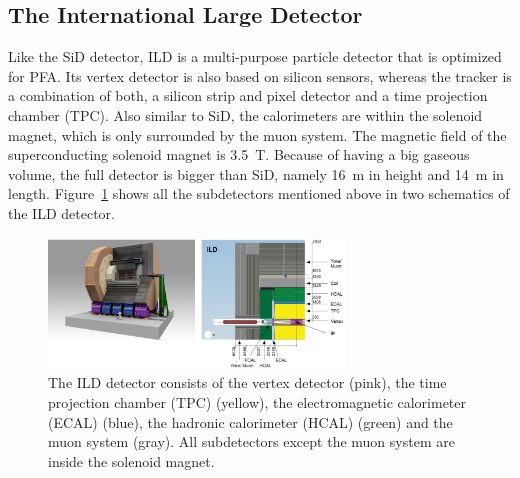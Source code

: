 \subsection{The International Large Detector}
Like the SiD detector, ILD is a multi-purpose particle detector that is optimized for PFA.
Its vertex detector is also based on silicon sensors, whereas the tracker is a combination of both, a silicon strip and pixel detector and a time projection chamber (TPC).
Also similar to SiD, the calorimeters are within the solenoid magnet, which is only surrounded by the muon system.
The magnetic field of the superconducting solenoid magnet is \SI{3.5}{T}.
Because of having a big gaseous volume, the full detector is bigger than SiD, namely \SI{16}{m} in height and \SI{14}{m} in length.
Figure~\ref{fig:ILD} shows all the subdetectors mentioned above in two schematics of the ILD detector.
\begin{figure}[H]
\centering
\includegraphics[width=0.7\textwidth]{Figures/ILD.png}
\caption[Schematic drawing of the ILD detector]{The ILD detector consists of the vertex detector (pink), the time projection chamber (TPC) (yellow), the electromagnetic calorimeter (ECAL) (blue), the hadronic calorimeter (HCAL) (green) and the muon system (gray). All subdetectors except the muon system are inside the solenoid magnet.\cite[p. 34]{TDR1}}
\label{fig:ILD}
\end{figure}
